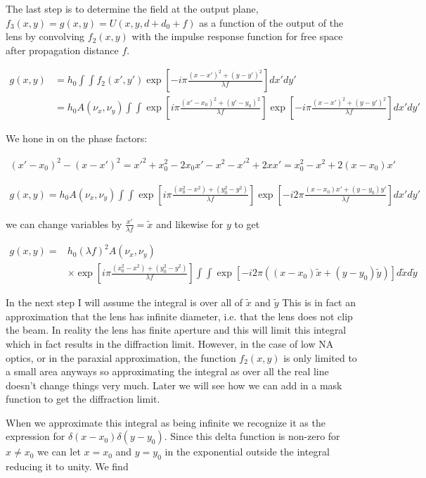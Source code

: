 \documentclass[12pt]{article}
\begin{document}
The last step is to determine the field at the output plane, $f_3(x,y) = g(x,y) = U(x,y,d+d_0+f)$ as a function of the output of the lens by convolving $f_2(x,y)$ with the impulse response function for free space after propagation distance $f$.

\begin{align}
g(x,y) &= h_0 \int \int f_2(x',y') \exp\left[-i\pi \frac{(x-x')^2+(y-y')^2}{\lambda f}\right]dx'dy'\\
&= h_0 A(\nu_x, \nu_y) \int \int \exp\left[i \pi\frac{(x'-x_0)^2 + (y'-y_0)^2}{\lambda f}\right] \exp\left[-i\pi \frac{(x-x')^2+(y-y')^2}{\lambda f}\right] dx'dy'
\end{align}

We hone in on the phase factors:

\begin{align}
(x'-x_0)^2 - (x-x')^2 = x'^2 + x_0^2 -2x_0 x' - x^2 - x'^2 + 2x x' = x_0^2 - x^2 + 2(x-x_0)x'
\end{align}

\begin{align}
g(x,y) = h_0 A(\nu_x,\nu_y) \int \int \exp\left[i\pi\frac{(x_0^2 - x^2) + (y_0^2 -y^2)}{\lambda f}\right] \exp\left[-i2\pi \frac{(x-x_0)x' + (y-y_0)y'}{\lambda f}\right] dx'dy'
\end{align}

we can change variables by $\frac{x'}{\lambda f} = \tilde{x}$ and likewise for $y$ to get

\begin{align}
g(x,y) =& h_0 (\lambda f)^2 A(\nu_x,\nu_y)\\
&\times \exp\left[i\pi\frac{(x_0^2 - x^2) + (y_0^2 -y^2)}{\lambda f}\right] \int \int \exp\left[-i2\pi \left((x-x_0)\tilde{x} + (y-y_0)\tilde{y}\right)\right] d\tilde{x} d\tilde{y}
\end{align}

In the next step I will assume the integral is over all of $\tilde{x}$ and $\tilde{y}$ This is in fact an approximation that the lens has infinite diameter, i.e. that the lens does not clip the beam. In reality the lens has finite aperture and this will limit this integral which in fact results in the diffraction limit. However, in the case of low NA optics, or in the paraxial approximation, the function $f_2(x,y)$ is only limited to a small area anyways so approximating the integral as over all the real line doesn't change things very much. Later we will see how we can add in a mask function to get the diffraction limit.

When we approximate this integral as being infinite we recognize it as the expression for $\delta(x-x_0)\delta(y-y_0)$. Since this delta function is non-zero for $x \neq x_0$ we can let $x=x_0$ and $y=y_0$ in the exponential outside the integral reducing it to unity. We find
\end{document}
